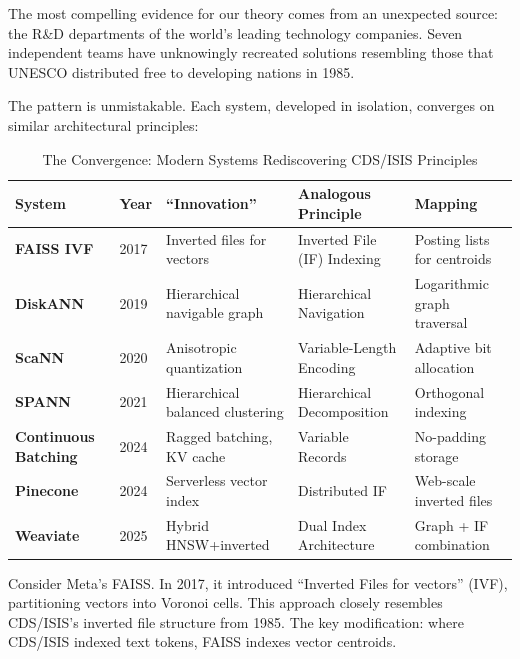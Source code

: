 \documentclass[manuscript,screen,nonacm]{acmart}
\begin{document}
The most compelling evidence for our theory comes from an unexpected source: the R\&D departments of the world's leading technology companies. Seven independent teams have unknowingly recreated solutions resembling those that UNESCO distributed free to developing nations in 1985.

The pattern is unmistakable. Each system, developed in isolation, converges on similar architectural principles:

\begin{table}[h]
\centering
\caption{The Convergence: Modern Systems Rediscovering CDS/ISIS Principles}
\label{tab:convergence}
\begin{tabular}{p{} p{} p{} p{} p{}}
\toprule
\textbf{System} & \textbf{Year} & \textbf{``Innovation''} & \textbf{Analogous Principle} & \textbf{Mapping} \\
\midrule
\textbf{FAISS IVF} \cite{johnson2017} & 2017 & Inverted files for vectors & Inverted File (IF) Indexing & Posting lists for centroids \\
\textbf{DiskANN} \cite{subramanya2019} & 2019 & Hierarchical navigable graph & Hierarchical Navigation & Logarithmic graph traversal \\
\textbf{ScaNN} \cite{guo2020} & 2020 & Anisotropic quantization & Variable-Length Encoding & Adaptive bit allocation \\
\textbf{SPANN} \cite{chen2021} & 2021 & Hierarchical balanced clustering & Hierarchical Decomposition & Orthogonal indexing \\
\textbf{Continuous Batching} \cite{reboul2025} & 2024 & Ragged batching, KV cache & Variable Records & No-padding storage \\
\textbf{Pinecone} \cite{pinecone2024} & 2024 & Serverless vector index & Distributed IF & Web-scale inverted files \\
\textbf{Weaviate} \cite{weaviate2025} & 2025 & Hybrid HNSW+inverted & Dual Index Architecture & Graph + IF combination \\
\bottomrule
\end{tabular}
\end{table}

Consider Meta's FAISS. In 2017, it introduced ``Inverted Files for vectors'' (IVF), partitioning vectors into Voronoi cells. This approach closely resembles CDS/ISIS's inverted file structure from 1985. The key modification: where CDS/ISIS indexed text tokens, FAISS indexes vector centroids.
\end{document}
